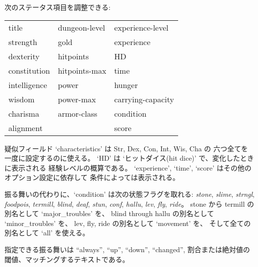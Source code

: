 次のステータス項目を調整できる:
\begin{center}
\begin{tabular}{lll}
title & dungeon-level & experience-level\\
strength & gold & experience\\
dexterity & hitpoints & HD\\
constitution & hitpoints-max & time\\
intelligence & power & hunger\\
wisdom & power-max & carrying-capacity\\
charisma & armor-class & condition\\
alignment &  & score\\
\end{tabular}
\end{center}
疑似フィールド `characteristics' は Str, Dex, Con, Int, Wis, Cha の
六つ全てを一度に設定するのに使える。
`HD' は `ヒットダイス(hit dice)' で、変化したときに表示される
経験レベルの概算である。
`experience', `time', `score' はその他のオプション設定に依存して
条件によっては表示される。

振る舞いの代わりに、`condition' は次の状態フラグを取れる:
{\it stone}, {\it slime}, {\it strngl}, {\it foodpois}, {\it termill},
{\it blind}, {\it deaf}, {\it stun}, {\it conf}, {\it hallu},
{\it lev}, {\it fly}, {\it ride}。
stone から termill の別名として `major\_troubles' を、
blind through hallu の別名として `minor\_troubles' を、
lev, fly, ride の別名として `movement' を、
そして全ての別名として `all' を使える。

指定できる振る舞いは ``always'', ``up'', ``down'', ``changed'',
割合または絶対値の閾値、マッチングするテキストである。

